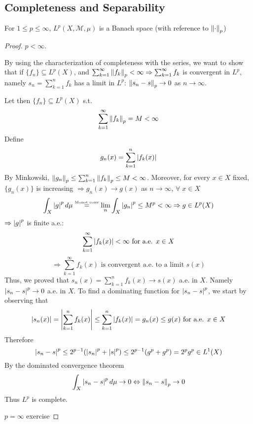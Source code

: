 \subsection*{Completeness and Separability}
\begin{theorem}
    For \(1 \leq p \leq \infty\), \(L^p(X, \mathcal{M}, \mu)\) is a Banach space (with reference to \(\norm{\cdot}_p\))
\end{theorem}
\begin{proof}
    \item \(p < \infty\).
    
    By using the characterization of completeness with the series, we want to show that 
    if \(\{f_n\} \subseteq L^p(X)\), and \(\sum_{k=1}^\infty\norm{f_k}_p < \infty \Rightarrow \sum_{k=1}^\infty f_k \) is convergent in \(L^p\), 
    namely \(s_n = \sum_{k=1}^n f_k\) has a limit in \(L^p\): \(\norm{s_n -s}_p \to 0 \) as \(n \to \infty\). 

    Let then \(\{f_n\} \subseteq L^p(X)\) s.t. 
    \[
        \sum_{k=1}^\infty \norm{f_k}_p = M < \infty 
    \]
    Define 
    \[
        g_n(x) = \sum_{k=1}^n \abs{f_k(x)}
    \]
    By Minkowski, \(\norm{g_n}_p \leq \sum_{k=1}^n \norm{f_k}_p \leq M < \infty\). 
    Moreover, for every \(x \in X\) fixed, \(\{g_n(x)\}\) is increasing \(\Rightarrow g_n(x) \to g(x)\) as \(n \to \infty\), \(\forall\; x \in X\)
    \[
        \int_X \abs{g}^p \, d\mu \overset{\text{\tiny{Monot conv}}}{=} \lim_n \int_X \abs{g_n}^p \leq M^p < \infty \Rightarrow g \in L^p(X)
    \]
    \(\Rightarrow \abs{g}^p \) is finite a.e.:
    \[
        \sum_{k=1}^\infty \abs{f_k(x)} < \infty \text{  for a.e. } x \in X
    \]
    \[
        \Rightarrow \sum_{k=1}^\infty f_k(x) \text{ is convergent a.e. to a limit } s(x)
    \]
    Thus, we proved that \(s_n(x) = \sum_{k=1}^n f_k(x) \to s(x)\) a.e. in \(X\). Namely \(\abs{s_n - s }^p \to 0\) a.e. in \(X\). To find a dominating function for \(\abs{s_n -s}^p\), we start by observing that
    \[
        \abs{s_n(x)} = \abs{\sum_{k=1}^n f_k(x)} \leq \sum_{k=1}^n \abs{f_k(x)} = g_n(x) \leq g(x) \text{ for a.e. } x \in X
    \]
    Therefore
    \[
        \abs{s_n -s }^p \leq 2^{p-1}(\abs{s_n}^p + \abs{s}^p) \leq 2^{p-1} (g^p + g^p ) = 2^p g^p \in L^1(X)
    \]
    By the dominated convergence theorem
    \[
        \int_X \abs{s_n -s }^p \, d\mu \to 0 \Leftrightarrow \norm{s_n -s}_p \to 0
    \]
    Thus \(L^p\) is complete.
    \item \(p=\infty\) exercise
\end{proof}

